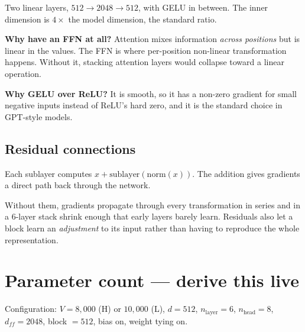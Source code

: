 \documentclass[11pt]{report}
\begin{document}
\begin{shortans}
Two linear layers, $512 \to 2048 \to 512$, with GELU in between. The inner
dimension is $4\times$ the model dimension, the standard ratio.
\end{shortans}

\begin{deeper}
\textbf{Why have an FFN at all?} Attention mixes information \emph{across
positions} but is linear in the values. The FFN is where per-position
non-linear transformation happens. Without it, stacking attention layers would
collapse toward a linear operation.

\medskip
\textbf{Why GELU over ReLU?} It is smooth, so it has a non-zero gradient for
small negative inputs instead of ReLU's hard zero, and it is the standard
choice in GPT-style models.
\end{deeper}

\subsection{Residual connections}

\begin{shortans}
Each sublayer computes $x + \mathrm{sublayer}(\mathrm{norm}(x))$. The addition
gives gradients a direct path back through the network.
\end{shortans}

\begin{deeper}
Without them, gradients propagate through every transformation in series and in
a 6-layer stack shrink enough that early layers barely learn. Residuals also
let a block learn an \emph{adjustment} to its input rather than having to
reproduce the whole representation.
\end{deeper}

\section{Parameter count --- derive this live}

Configuration: $V = 8{,}000$ (H) or $10{,}000$ (L), $d = 512$, $n_{\text{layer}}
= 6$, $n_{\text{head}} = 8$, $d_{ff} = 2048$, block $= 512$, bias on, weight
tying on.
\end{document}
